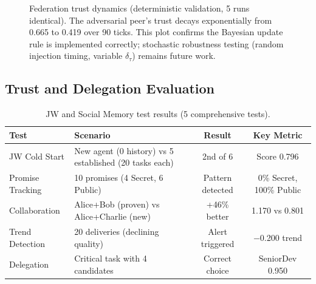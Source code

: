 \documentclass[11pt]{article}
\begin{document}
\begin{figure}[H]
\centering
{}
\caption{Federation trust dynamics (deterministic validation, 5 runs
identical). The adversarial peer's trust decays exponentially from 0.665 to
0.419 over 90 ticks. This plot confirms the Bayesian update rule is
implemented correctly; stochastic robustness testing (random injection
timing, variable $\delta_\tau$) remains future work.}
\label{fig:federation}
\end{figure}

\subsection{Trust and Delegation Evaluation}

\begin{table}[H]
\centering
\caption{JW and Social Memory test results (5 comprehensive tests).}
\label{tab:trust_results}
\small
{}
\begin{tabular}{lp{5.5cm}cc}
\toprule
\textbf{Test} & \textbf{Scenario} & \textbf{Result} & \textbf{Key Metric} \\
\midrule
JW Cold Start & New agent (0 history) vs 5 established (20 tasks each) & 2nd of 6 & Score 0.796 \\
Promise Tracking & 10 promises (4 Secret, 6 Public) & Pattern detected & 0\% Secret, 100\% Public \\
Collaboration & Alice+Bob (proven) vs Alice+Charlie (new) & +46\% better & 1.170 vs 0.801 \\
Trend Detection & 20 deliveries (declining quality) & Alert triggered & $-$0.200 trend \\
Delegation & Critical task with 4 candidates & Correct choice & SeniorDev 0.950 \\
\bottomrule
\end{tabular}
\end{table}
\end{document}
